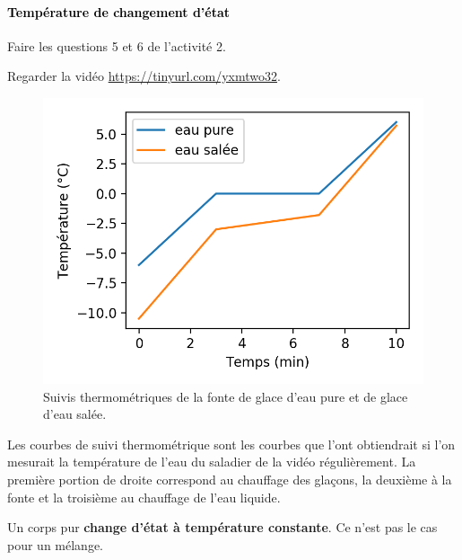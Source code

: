 \documentclass[12pt,a4paper]{article}
\begin{document}
\paragraph{\textcolor{black}{Température de changement d'état}}

\begin{conseil}
Faire les questions 5 et 6 de l'activité 2.
\end{conseil}

\begin{conseil}
Regarder la vidéo \href{https://tinyurl.com/yxmtwo32}{https://tinyurl.com/yxmtwo32}.
\end{conseil}

\begin{figure}[h]
\center
\includegraphics[scale=0.75]{../images/fusion.png}
\caption{Suivis thermométriques de la fonte de glace d'eau pure et de glace d'eau salée.}
\end{figure}

\begin{remarque}
Les courbes de suivi thermométrique sont les courbes que l'ont obtiendrait si l'on mesurait la température de l'eau du saladier de la vidéo régulièrement.
La première portion de droite correspond au chauffage des glaçons, la deuxième à la fonte et la troisième au chauffage de l'eau liquide.
\end{remarque}

\begin{definition}
Un corps pur \textbf{change d'état à température constante}.
Ce n'est pas le cas pour un mélange.
\end{definition}
\end{document}
